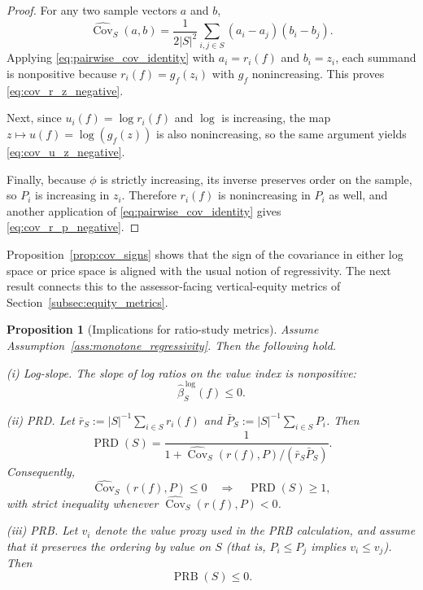 \documentclass[12pt, draft]{article}
\theoremstyle{plain}
\newtheorem{proposition}{Proposition}
\theoremstyle{definition}
\newcommand{\1}{\mathbf{1}}
\begin{document}
{\begin{proof}
For any two sample vectors $a$ and $b$,
\begin{equation}
\label{eq:pairwise_cov_identity}
\widehat{\operatorname{Cov}}_S(a,b)
=
\frac{1}{2|S|^2}
\sum_{i,j\in S}
(a_i-a_j)(b_i-b_j).
\end{equation}
Applying \eqref{eq:pairwise_cov_identity} with $a_i=r_i(f)$ and $b_i=z_i$, each summand is nonpositive because $r_i(f)=g_f(z_i)$ with $g_f$ nonincreasing. This proves \eqref{eq:cov_r_z_negative}.

Next, since $u_i(f)=\log r_i(f)$ and $\log$ is increasing, the map $z\mapsto u(f)=\log(g_f(z))$ is also nonincreasing, so the same argument yields \eqref{eq:cov_u_z_negative}.

Finally, because $\phi$ is strictly increasing, its inverse preserves order on the sample, so $P_i$ is increasing in $z_i$. Therefore $r_i(f)$ is nonincreasing in $P_i$ as well, and another application of \eqref{eq:pairwise_cov_identity} gives \eqref{eq:cov_r_p_negative}.
\end{proof}

Proposition~\ref{prop:cov_signs} shows that the sign of the covariance in either log space or price space is aligned with the usual notion of regressivity. The next result connects this to the assessor-facing vertical-equity metrics of Section~\ref{subsec:equity_metrics}.

\begin{proposition}[Implications for ratio-study metrics]
\label{prop:metrics_alignment}
Assume Assumption~\ref{ass:monotone_regressivity}. Then the following hold.

\smallskip
\noindent
\emph{(i) Log-slope.} The slope of log ratios on the value index is nonpositive:
\[
\widehat\beta^{\,\log}_S(f)\le 0.
\]

\smallskip
\noindent
\emph{(ii) PRD.} Let $\bar r_S:=|S|^{-1}\sum_{i\in S} r_i(f)$ and $\bar P_S:=|S|^{-1}\sum_{i\in S} P_i$. Then
\begin{equation}
\label{eq:prd_cov_identity}
\operatorname{PRD}(S)
=
\frac{1}
{1+\widehat{\operatorname{Cov}}_S(r(f),P)/(\bar r_S\bar P_S)}.
\end{equation}
Consequently,
\[
\widehat{\operatorname{Cov}}_S(r(f),P)\le 0
\quad\Longrightarrow\quad
\operatorname{PRD}(S)\ge 1,
\]
with strict inequality whenever $\widehat{\operatorname{Cov}}_S(r(f),P)<0$.

\smallskip
\noindent
\emph{(iii) PRB.} Let $v_i$ denote the value proxy used in the PRB calculation, and assume that it preserves the ordering by value on $S$ (that is, $P_i\le P_j$ implies $v_i\le v_j$). Then
\[
\operatorname{PRB}(S)\le 0.
\]


\end{proposition}}
\end{document}
